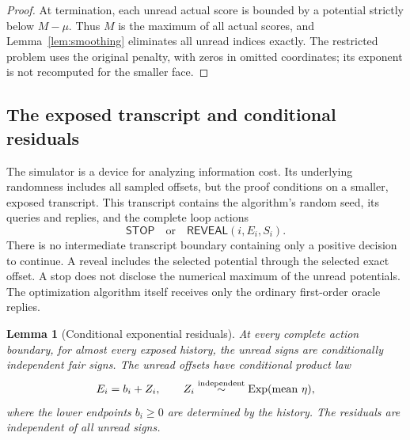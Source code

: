 \documentclass[11pt,a4paper]{article}
\newtheorem{lemma}[theorem]{Lemma}
\theoremstyle{definition}
\theoremstyle{remark}
\DeclareMathOperator{\Exp}{Exp}
\begin{document}
\begin{proof}
At termination, each unread actual score is bounded by a potential strictly
below $M-\mu$. Thus $M$ is the maximum of all actual scores, and
Lemma~\ref{lem:smoothing} eliminates all unread indices exactly.
The restricted problem uses the original penalty, with zeros in omitted
coordinates; its exponent is not recomputed for the smaller face.
\end{proof}

\subsection{The exposed transcript and conditional residuals}

The simulator is a device for analyzing information cost. Its underlying
randomness includes all sampled offsets, but the proof conditions on a
smaller, exposed transcript. This transcript contains the algorithm's random
seed, its queries and replies, and the complete loop actions
\[
   \mathsf{STOP}
   \quad\text{or}\quad
   \mathsf{REVEAL}(i,E_i,S_i).
\]
There is no intermediate transcript boundary containing only a positive
decision to continue. A reveal includes the selected potential through the
selected exact offset. A stop does not disclose the numerical maximum of
the unread potentials. The optimization algorithm itself receives only the
ordinary first-order oracle replies.

\begin{lemma}[Conditional exponential residuals]\label{lem:memoryless}
At every complete action boundary, for almost every exposed history, the
unread signs are conditionally independent fair signs. The unread offsets
have conditional product law
\begin{equation}\label{eq:posterior}
   E_i=b_i+Z_i,\qquad
   Z_i\stackrel{\rm independent}{\sim}\Exp(\text{mean }\eta),
\end{equation}
where the lower endpoints $b_i\ge0$ are determined by the history.
The residuals are independent of all unread signs.
\end{lemma}
\end{document}
